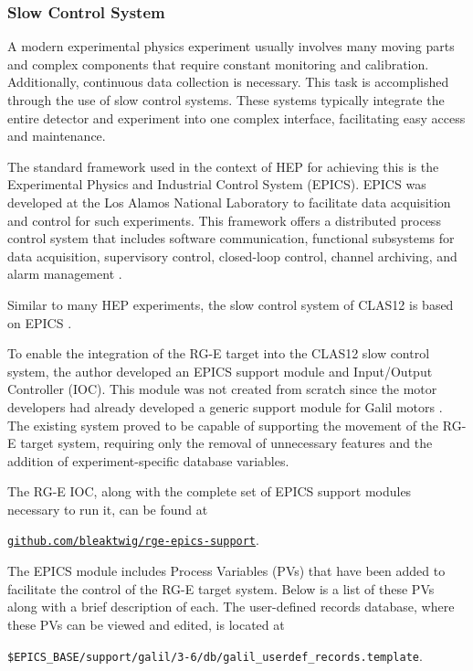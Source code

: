 \subsubsection{Slow Control System}
\label{11.310::slow_control_system}
    A modern experimental physics experiment usually involves many moving parts and complex components that require constant monitoring and calibration.
    Additionally, continuous data collection is necessary.
    This task is accomplished through the use of slow control systems.
    These systems typically integrate the entire detector and experiment into one complex interface, facilitating easy access and maintenance.

    The standard framework used in the context of HEP for achieving this is the Experimental Physics and Industrial Control System (EPICS).
    EPICS was developed at the Los Alamos National Laboratory to facilitate data acquisition and control for such experiments.
    This framework offers a distributed process control system that includes software communication, functional subsystems for data acquisition, supervisory control, closed-loop control, channel archiving, and alarm management \cite{dalesio1991}.

    Similar to many HEP experiments, the slow control system of CLAS12 is based on EPICS \cite{boyarinov2020}.

    To enable the integration of the RG-E target into the CLAS12 slow control system, the author developed an EPICS support module and Input/Output Controller (IOC).
    This module was not created from scratch since the motor developers had already developed a generic support module for Galil motors \cite{farnswort2009}.
    The existing system proved to be capable of supporting the movement of the RG-E target system, requiring only the removal of unnecessary features and the addition of experiment-specific database variables.

    The RG-E IOC, along with the complete set of EPICS support modules necessary to run it, can be found at

    \begin{center}
        \href{https://github.com/bleaktwig/rge-epics-support}{\texttt{github.com/bleaktwig/rge-epics-support}}.
    \end{center}

    The EPICS module includes Process Variables (PVs) that have been added to facilitate the control of the RG-E target system.
    Below is a list of these PVs along with a brief description of each.
    The user-defined records database, where these PVs can be viewed and edited, is located at

    \begin{center}
        \texttt{\$EPICS\_BASE/support/galil/3-6/db/galil\_userdef\_records.template}.
    \end{center}

    
    
    
